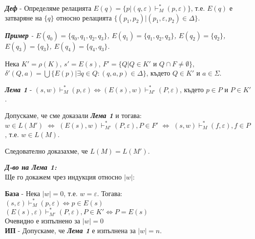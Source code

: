 \documentclass[fleqn,12pt]{article}
\begin{document}
\begin{flushleft}
\textit{\textbf{Деф}} - Определяме релацията $E(q) = \{p | (q, \varepsilon) \vdash_M^* (p, \varepsilon)\}$, т.е. $E(q)$ е затваряне на $\{q\}$ относно релацията $\{(p_1, p_2) | (p_1, \varepsilon, p_2) \in \Delta\}$.

\textit{\textbf{Пример} - $E(q_0) = \{q_0, q_1, q_2, q_3\}$, $E(q_1) = \{q_1, q_2, q_3\}$, $E(q_2) = \{q_2\}$, $E(q_3) = \{q_3\}$, $E(q_4) = \{q_4, q_3\}$.}


Нека $K' = \rho(K)$, $s' = E(s)$, $F' = \{Q | Q \in K' $ и $ Q \cap F \neq \emptyset \}$, $\delta'(Q, a) = \bigcup \{E(p) | \exists q \in Q: (q, a, p) \in \Delta\}$, където $Q \in K'$ и $a \in \Sigma$.

\textit{\textbf{Лема 1}} - $(s, w) \vdash_M^* (p, \varepsilon) \iff (E(s), w) \vdash_{M'}^* (P, \varepsilon)$, където $p \in P$ и $P \in K'$.

Допускаме, че сме доказали \textit{\textbf{Лема 1}} и тогава: \\

$w \in L(M')$ $\iff$ $(E(s), w) \vdash_{M'}^* (P, \varepsilon), P \in F'$ $\iff$ $(s, w) \vdash_M^* (f, \varepsilon), f \in P$, т.е. $w \in L(M)$.

Следователно доказахме, че $L(M) = L(M')$.

\textit{\textbf{Д-во  на Лема 1:}} \\

Ще го докажем чрез индукция относно $|w|$:

\textbf{База} - Нека $|w| = 0$, т.е. $w = \varepsilon$. Тогава: \\
$(s, \varepsilon) \vdash_M^* (p, \varepsilon) \iff p \in E(s)$ \\
$(E(s), \varepsilon) \vdash_{M'}^* (P, \varepsilon), P \in K' \iff P = E(s)$ \\
Очевидно е изпълнено за $|w| = 0$ \\

\textbf{ИП} - Допускаме, че \textit{\textbf{Лема 1}} е изпълнена за $|w| = n$. \\


\end{flushleft}
\end{document}
